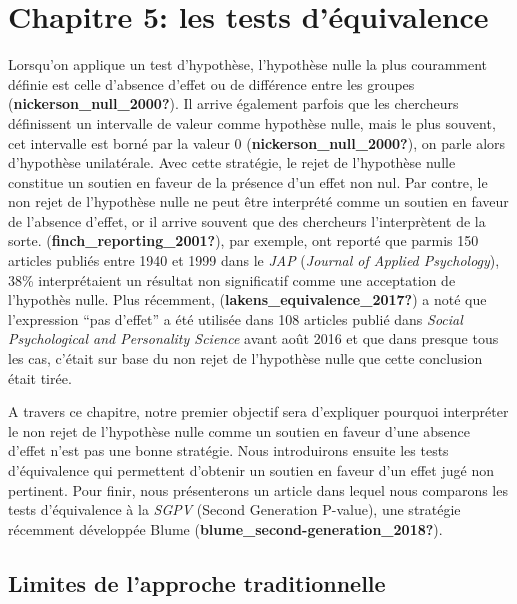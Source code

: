 \documentclass[
  english,
  man]{apa6}
\author{\phantom{0}}
\date{}
\affiliation{\phantom{0}}
\begin{document}
\hypertarget{chapitre-5-les-tests-duxe9quivalence}{%
\section{Chapitre 5: les tests d'équivalence}\label{chapitre-5-les-tests-duxe9quivalence}}

Lorsqu'on applique un test d'hypothèse, l'hypothèse nulle la plus couramment définie est celle d'absence d'effet ou de différence entre les groupes (\textbf{nickerson\_null\_2000?}). Il arrive également parfois que les chercheurs définissent un intervalle de valeur comme hypothèse nulle, mais le plus souvent, cet intervalle est borné par la valeur 0 (\textbf{nickerson\_null\_2000?}), on parle alors d'hypothèse unilatérale. Avec cette stratégie, le rejet de l'hypothèse nulle constitue un soutien en faveur de la présence d'un effet non nul. Par contre, le non rejet de l'hypothèse nulle ne peut être interprété comme un soutien en faveur de l'absence d'effet, or il arrive souvent que des chercheurs l'interprètent de la sorte. (\textbf{finch\_reporting\_2001?}), par exemple, ont reporté que parmis 150 articles publiés entre 1940 et 1999 dans le \emph{JAP} (\emph{Journal of Applied Psychology}), 38\% interprétaient un résultat non significatif comme une acceptation de l'hypothès nulle. Plus récemment, (\textbf{lakens\_equivalence\_2017?}) a noté que l'expression ``pas d'effet'' a été utilisée dans 108 articles publié dans \emph{Social Psychological and Personality Science} avant août 2016 et que dans presque tous les cas, c'était sur base du non rejet de l'hypothèse nulle que cette conclusion était tirée.

A travers ce chapitre, notre premier objectif sera d'expliquer pourquoi interpréter le non rejet de l'hypothèse nulle comme un soutien en faveur d'une absence d'effet n'est pas une bonne stratégie. Nous introduirons ensuite les tests d'équivalence qui permettent d'obtenir un soutien en faveur d'un effet jugé non pertinent. Pour finir, nous présenterons un article dans lequel nous comparons les tests d'équivalence à la \emph{SGPV} (Second Generation P-value), une stratégie récemment développée Blume (\textbf{blume\_second-generation\_2018?}).

\hypertarget{limites-de-lapproche-traditionnelle}{%
\subsection{Limites de l'approche traditionnelle}\label{limites-de-lapproche-traditionnelle}}
\end{document}
